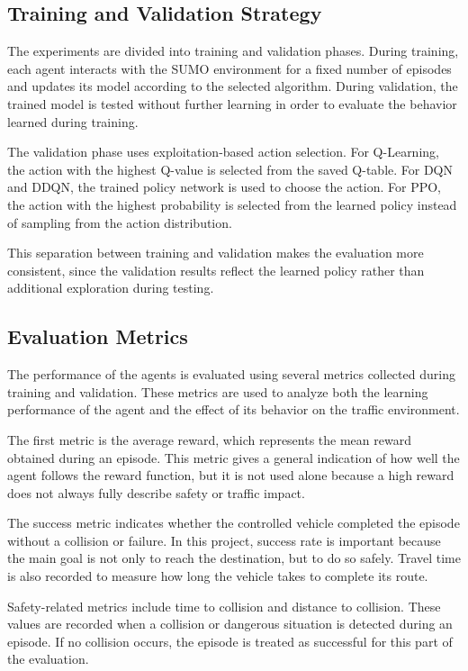\documentclass{article}
\begin{document}
\subsection{Training and Validation Strategy}

The experiments are divided into training and validation phases. During training, each agent interacts with the SUMO environment for a fixed number of episodes and updates its model according to the selected algorithm. During validation, the trained model is tested without further learning in order to evaluate the behavior learned during training.

The validation phase uses exploitation-based action selection. For Q-Learning, the action with the highest Q-value is selected from the saved Q-table. For DQN and DDQN, the trained policy network is used to choose the action. For PPO, the action with the highest probability is selected from the learned policy instead of sampling from the action distribution.

This separation between training and validation makes the evaluation more consistent, since the validation results reflect the learned policy rather than additional exploration during testing.

\subsection{Evaluation Metrics}

The performance of the agents is evaluated using several metrics collected during training and validation. These metrics are used to analyze both the learning performance of the agent and the effect of its behavior on the traffic environment.

The first metric is the average reward, which represents the mean reward obtained during an episode. This metric gives a general indication of how well the agent follows the reward function, but it is not used alone because a high reward does not always fully describe safety or traffic impact.

The success metric indicates whether the controlled vehicle completed the episode without a collision or failure. In this project, success rate is important because the main goal is not only to reach the destination, but to do so safely. Travel time is also recorded to measure how long the vehicle takes to complete its route.

Safety-related metrics include time to collision and distance to collision. These values are recorded when a collision or dangerous situation is detected during an episode. If no collision occurs, the episode is treated as successful for this part of the evaluation.
\end{document}
